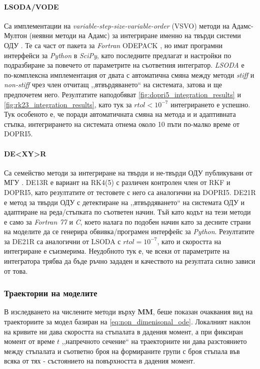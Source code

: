 \paragraph{LSODA/VODE} Са имплементации на \textit{variable-step-size-variable-order} (VSVO) методи на Адамс-Мултон (неявни методи на Адамс) за интегриране именно на твърди системи ОДУ \cite{Shampine2002}. Те са част от пакета за \textit{Fortran} ODEPACK \cite{odepack1992}, но имат програмни интерфейси за \textit{Python} в \textit{SciPy}, като последните предлагат и настройки по подразбиране за повечето от параметрите на съответния интегратор. \textit{LSODA} е по-комплексна имплементация от двата с автоматична смяна между методи \textit{stiff} и \textit{non-stiff} чрез член отчитащ ,,втвърдяването`` на системата, затова и ще предпочетем него. Резултатите наподобяват \autoref{fig:dopri5_integration_results} и \autoref{fig:rk23_integration_results}, като тук за $rtol < 10^{-7}$ интегрирането е успешно. Тук особеното е, че поради автоматичната смяна на метода и и адаптивната стъпка, интегрирането на системата отнема около 10 пъти по-малко време от DOPRI5. 

\paragraph{DE<XY>R} Са семейство методи за интегриране на твърди и не-твърди ОДУ публикувани от МГУ \cite{DEXYRD}. DE13R е вариант на RK4(5) с различен контролен член от RKF и DOPRI5, като резултатите от тестовете с него са аналогични на DOPRI5. DE21R е метод за твърди ОДУ с детектиране на ,,втвърдяването`` на системата ОДУ и адаптиране на реда/стъпката по съответен начин. Тъй като кодът на тези методи е само за \textit{Fortran 77} и \textit{C}, което налага по подобен начин като за десните страни на моделите да се генерира обвивка/програмен интерфейс за \textit{Python}. Резултатите за DE21R са аналогични от LSODA с $rtol = 10^{-7}$, като и скоростта на интегриране е съизмерима. Неудобното тук е, че всеки от параметрите на интегратора трябва да бъде ръчно зададен и качеството на резултата силно зависи от това.

\subsubsection{Траектории на моделите}
В изследването на числените методи върху \textbf{MM}, беше показан очаквания вид на траекториите за модел базиран на \autoref{eq:non_dimenisonal_ode}. Локалният наклон на кривите ни дава скоростта на стъпалата в дадения момент, а при фиксиран момент от време $t$ ,,напречното сечение`` на траекториите ни дава разстоянието между стъпалата и съответно броя на формираните групи с броя стъпала във всяка от тях - състоянието на повърхността в дадения момент.

